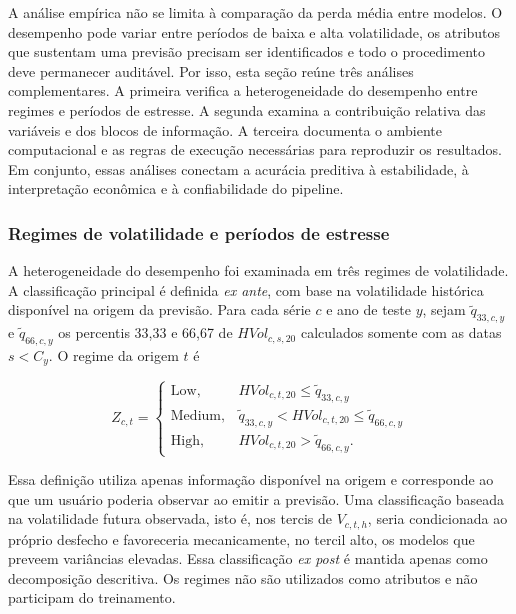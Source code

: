 \documentclass[a4paper,fleqn]{cas-sc}
\begin{document}
A análise empírica não se limita à comparação da perda média entre modelos. O desempenho pode variar entre períodos de baixa e alta volatilidade, os atributos que sustentam uma previsão precisam ser identificados e todo o procedimento deve permanecer auditável. Por isso, esta seção reúne três análises complementares. A primeira verifica a heterogeneidade do desempenho entre regimes e períodos de estresse. A segunda examina a contribuição relativa das variáveis e dos blocos de informação. A terceira documenta o ambiente computacional e as regras de execução necessárias para reproduzir os resultados. Em conjunto, essas análises conectam a acurácia preditiva à estabilidade, à interpretação econômica e à confiabilidade do pipeline.

\subsubsection{Regimes de volatilidade e períodos de estresse}
\label{subsec:regimes}

A heterogeneidade do desempenho foi examinada em três regimes de volatilidade. A classificação principal é definida \textit{ex ante}, com base na volatilidade histórica disponível na origem da previsão. Para cada série \(c\) e ano de teste \(y\), sejam \(\tilde q_{33,c,y}\) e \(\tilde q_{66,c,y}\) os percentis 33,33 e 66,67 de \(HVol_{c,s,20}\) calculados somente com as datas \(s<C_y\). O regime da origem \(t\) é

\begin{equation}
Z_{c,t}
=
\begin{cases}
\mathrm{Low}, & HVol_{c,t,20}\leq \tilde q_{33,c,y} \\
\mathrm{Medium}, & \tilde q_{33,c,y}<HVol_{c,t,20}\leq \tilde q_{66,c,y} \\
\mathrm{High}, & HVol_{c,t,20}>\tilde q_{66,c,y}.
\end{cases}
\label{eq:regimes}
\end{equation}

Essa definição utiliza apenas informação disponível na origem e corresponde ao que um usuário poderia observar ao emitir a previsão. Uma classificação baseada na volatilidade futura observada, isto é, nos tercis de \(V_{c,t,h}\), seria condicionada ao próprio desfecho e favoreceria mecanicamente, no tercil alto, os modelos que preveem variâncias elevadas. Essa classificação \textit{ex post} é mantida apenas como decomposição descritiva. Os regimes não são utilizados como atributos e não participam do treinamento.
\end{document}
